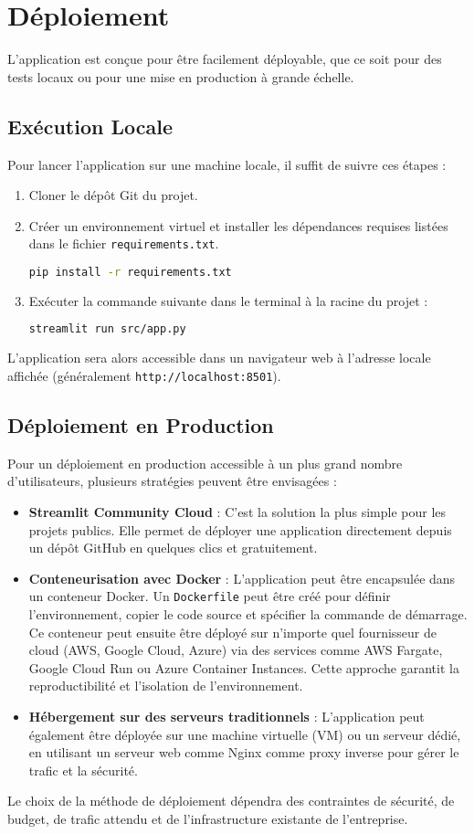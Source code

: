 \section{Déploiement}
L'application est conçue pour être facilement déployable, que ce soit pour des tests locaux ou pour une mise en production à grande échelle.

\subsection{Exécution Locale}
Pour lancer l'application sur une machine locale, il suffit de suivre ces étapes :
\begin{enumerate}
    \item Cloner le dépôt Git du projet.
    \item Créer un environnement virtuel et installer les dépendances requises listées dans le fichier \texttt{requirements.txt}.
    \begin{lstlisting}[language=bash]
pip install -r requirements.txt
    \end{lstlisting}
    \item Exécuter la commande suivante dans le terminal à la racine du projet :
    \begin{lstlisting}[language=bash]
streamlit run src/app.py
    \end{lstlisting}
\end{enumerate}
L'application sera alors accessible dans un navigateur web à l'adresse locale affichée (généralement \texttt{http://localhost:8501}).

\subsection{Déploiement en Production}
Pour un déploiement en production accessible à un plus grand nombre d'utilisateurs, plusieurs stratégies peuvent être envisagées :
\begin{itemize}
    \item \textbf{Streamlit Community Cloud} : C'est la solution la plus simple pour les projets publics. Elle permet de déployer une application directement depuis un dépôt GitHub en quelques clics et gratuitement.
    \item \textbf{Conteneurisation avec Docker} : L'application peut être encapsulée dans un conteneur Docker. Un \texttt{Dockerfile} peut être créé pour définir l'environnement, copier le code source et spécifier la commande de démarrage. Ce conteneur peut ensuite être déployé sur n'importe quel fournisseur de cloud (AWS, Google Cloud, Azure) via des services comme AWS Fargate, Google Cloud Run ou Azure Container Instances. Cette approche garantit la reproductibilité et l'isolation de l'environnement.
    \item \textbf{Hébergement sur des serveurs traditionnels} : L'application peut également être déployée sur une machine virtuelle (VM) ou un serveur dédié, en utilisant un serveur web comme Nginx comme proxy inverse pour gérer le trafic et la sécurité.
\end{itemize}
Le choix de la méthode de déploiement dépendra des contraintes de sécurité, de budget, de trafic attendu et de l'infrastructure existante de l'entreprise.

